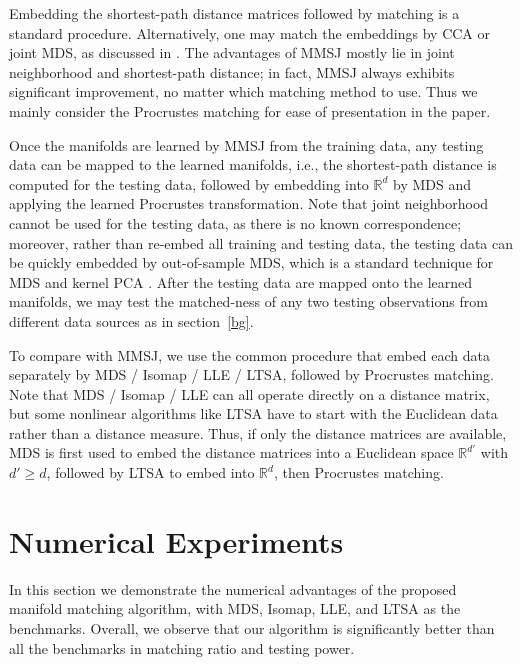 \documentclass[times,twocolumn,final]{elsarticle}
\begin{document}
Embedding the shortest-path distance matrices followed by matching is a standard procedure. Alternatively, one may match the embeddings by CCA or joint MDS, as discussed in \citep{PriebeMarchette2012, FishkindShenPriebe2016}. The advantages of MMSJ mostly lie in joint neighborhood and shortest-path distance; in fact, MMSJ always exhibits significant improvement, no matter which matching method to use. Thus we mainly consider the Procrustes matching for ease of presentation in the paper.

Once the manifolds are learned by MMSJ from the training data, any testing data can be mapped to the learned manifolds, i.e., the shortest-path distance is computed for the testing data, followed by embedding into $\mathbb{R}^{d}$ by MDS and applying the learned Procrustes transformation. Note that joint neighborhood cannot be used for the testing data, as there is no known correspondence; moreover, rather than re-embed all training and testing data, the testing data can be quickly embedded by out-of-sample MDS, which is a standard technique for MDS and kernel PCA \citep{ScholkopfSmolaMuller1998,BengioEtal2003,TrossetPriebe2008}. After the testing data are mapped onto the learned manifolds, we may test the matched-ness of any two testing observations from different data sources as in section~\ref{bg}.

To compare with MMSJ, we use the common procedure that embed each data separately by MDS / Isomap / LLE / LTSA, followed by Procrustes matching. Note that MDS / Isomap / LLE can all operate directly on a distance matrix, but some nonlinear algorithms like LTSA have to start with the Euclidean data rather than a distance measure. Thus, if only the distance matrices are available, MDS is first used to embed the distance matrices into a Euclidean space $\mathbb{R}^{d'}$ with $d' \geq d$, followed by LTSA to embed into $\mathbb{R}^{d}$, then Procrustes matching.

%
%
%
%
%

\section{Numerical Experiments}
\label{numer}
In this section we demonstrate the numerical advantages of the proposed manifold matching algorithm, with MDS, Isomap, LLE, and LTSA as the benchmarks. Overall, we observe that our algorithm is significantly better than all the benchmarks in matching ratio and testing power. 
\end{document}
